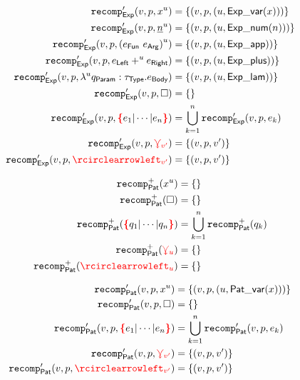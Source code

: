 
\begin{align*}
  \eRecompPrime{v}{p}{\varExp{x}{u}}
  &= \{(v, p, (u, \ExpVar(x)))\}
  \\
  \eRecompPrime{v}{p}{\numExp{n}{u}}
  &= \{(v, p, (u, \ExpNum(n)))\}
  \\
  \eRecompPrime{v}{p}{\appExp{e_\AppFun}{e_\AppArg}{u}}
  &= \{(v, p, (u, \ExpApp))\}
  \\
  \eRecompPrime{v}{p}{\plusExp{e_\PlusLeft}{u} {e_\PlusRight}}
  &= \{(v, p, (u, \ExpPlus))\}
  \\
  \eRecompPrime{v}{p}{\lamExp{u}{q_\LamParam}{\tau_\LamType}{e_\LamBody}}
  &= \{(v, p, (u, \ExpLam))\}
  \\
  \eRecompPrime{v}{p}{\hole} &= \{\}
  \\
  \eRecompPrime{v}{p}{\conflictHole{e_1 | \cdots | e_n}}
  &= \bigcup_{k=1}^n \eRecompPrime{v}{p}{e_k}
  \\
  \eRecompPrime{v}{p}{\multiVertex{v'}}
  &= \{(v, p, v')\}
  \\
  \eRecompPrime{v}{p}{\cycleVertex{v'}}
  &= \{(v, p, v')\}
\end{align*}


\begin{align*}
  \qRecompPlus{\varPat{x}{u}} &= \{\}
  \\
  \qRecompPlus{\hole} &= \{\}
  \\
  \qRecompPlus{\conflictHole{q_1 | \cdots | q_n}}
  &= \bigcup_{k=1}^n \qRecompPlus{q_k}
  \\
  \qRecompPlus{\multiVertex{u}} &= \{\}
  \\
  \qRecompPlus{\cycleVertex{u}} &= \{\}
\end{align*}

\begin{align*}
  \qRecompPrime{v}{p}{\varPat{x}{u}}
  &= \{(v, p, (u, \PatVar(x)))\}
  \\
  \qRecompPrime{v}{p}{\hole} &= \{\}
  \\
  \qRecompPrime{v}{p}{\conflictHole{e_1 | \cdots | e_n}}
  &= \bigcup_{k=1}^n \qRecompPrime{v}{p}{e_k}
  \\
  \qRecompPrime{v}{p}{\multiVertex{v'}}
  &= \{(v, p, v')\}
  \\
  \qRecompPrime{v}{p}{\cycleVertex{v'}}
  &= \{(v, p, v')\}
\end{align*}

